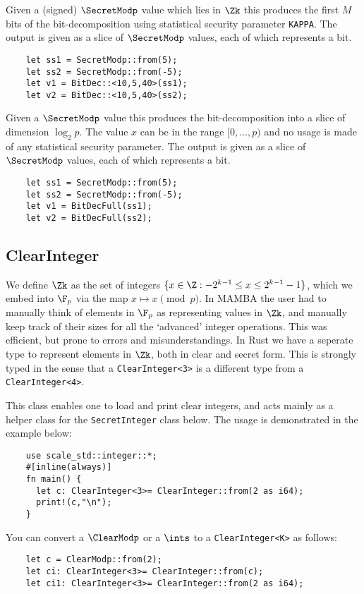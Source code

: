 Given a (signed) $\SecretModp$ value which lies in $\Zk$
this produces the first $M$ bits of the bit-decomposition using 
statistical security parameter \verb|KAPPA|.
The output is given as a slice of $\SecretModp$ values, each
of which represents a bit.
\begin{lstlisting}
    let ss1 = SecretModp::from(5);
    let ss2 = SecretModp::from(-5);
    let v1 = BitDec::<10,5,40>(ss1);
    let v2 = BitDec::<10,5,40>(ss2);
\end{lstlisting}

Given a $\SecretModp$ value this produces the bit-decomposition
into a slice of dimension $\log_2 p$.
The value $x$ can be in the range $[0,\ldots,p)$ and no usage
is made of any statistical security parameter.
The output is given as a slice of $\SecretModp$ values, each
of which represents a bit.
\begin{lstlisting}
    let ss1 = SecretModp::from(5);
    let ss2 = SecretModp::from(-5);
    let v1 = BitDecFull(ss1);
    let v2 = BitDecFull(ss2);
\end{lstlisting}


\subsection{ClearInteger}
We define $\Zk$ as the set of integers $\{x \in \Z: -2^{k-1} \le x \le 2^{k-1}-1\}$,
which we embed into $\F_p$ via the map $x \mapsto x \pmod{p}$.
In MAMBA the user had to manually think of elements in $\F_p$
as representing values in $\Zk$, and manually keep track of their
sizes for all the `advanced' integer operations.
This was efficient, but prone to errors and misunderstandings.
In Rust we have a seperate type to represent elements in $\Zk$,
both in clear and secret form.
This is strongly typed in the sense that a
\verb|ClearInteger<3>|  is a different type from a
\verb|ClearInteger<4>|.

This class enables one to load and print clear integers, and acts
mainly as a helper class for the \verb|SecretInteger| class below.
The usage is demonstrated in the example below:
\begin{lstlisting}
    use scale_std::integer::*;
    #[inline(always)]
    fn main() {
      let c: ClearInteger<3>= ClearInteger::from(2 as i64);
      print!(c,"\n");
    }
\end{lstlisting}

You can convert a $\ClearModp$ or a $\ints$ to a \verb|ClearInteger<K>| as follows:
\begin{lstlisting}
    let c = ClearModp::from(2);
    let ci: ClearInteger<3>= ClearInteger::from(c);
    let ci1: ClearInteger<3>= ClearInteger::from(2 as i64);
\end{lstlisting}

